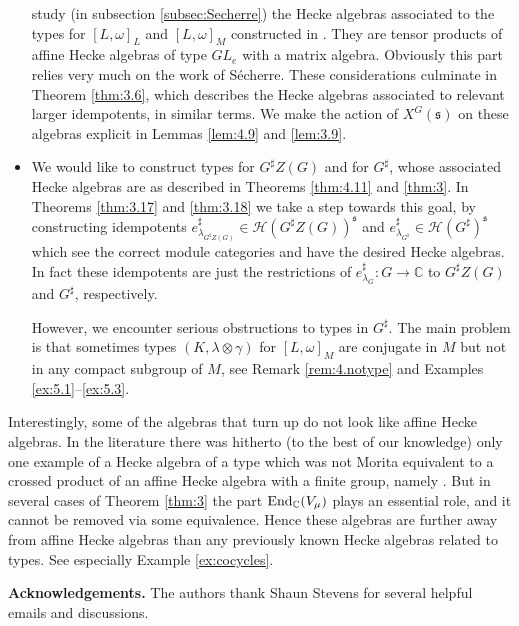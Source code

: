 \documentclass[11pt]{amsart}
\theoremstyle{definition}
\begin{document}
\begin{itemize}
study (in subsection \ref{subsec:Secherre}) the Hecke algebras associated to the types 
for $[L,\omega]_L$ and $[L,\omega]_M$ constructed in \cite{Sec3}. They are tensor products
of affine Hecke algebras of type $GL_e$ with a matrix algebra. Obviously this part relies 
very much on the work of S\'echerre. These considerations culminate in Theorem \ref{thm:3.6},
which describes the Hecke algebras associated to relevant larger idempotents, in similar 
terms. We make the action of $X^G ({{\mathfrak s}})$ on these algebras explicit in Lemmas \ref{lem:4.9} 
and \ref{lem:3.9}.
\item We would like to construct types for $G^\sharp Z(G)$ and for $G^\sharp$, whose
associated Hecke algebras are as described in Theorems \ref{thm:4.11} and \ref{thm:3}.
In Theorems \ref{thm:3.17} and \ref{thm:3.18} we take a step towards this goal, by 
constructing idempotents $e^\sharp_{\lambda_{G^\sharp Z(G)}} \in {{\mathcal H}} (G^\sharp Z(G))^{{\mathfrak s}}$ 
and $e^\sharp_{\lambda_{G^\sharp}} \in {{\mathcal H}} (G^\sharp)^{{\mathfrak s}}$ which see the correct module 
categories and have the desired Hecke algebras. In fact these idempotents are just the
restrictions of $e^\sharp_{\lambda_G} : G \to {\mathbb C}$ to $G^\sharp Z(G)$ and $G^\sharp$, 
respectively. 

However, we encounter serious obstructions to types in $G^\sharp$. The main problem
is that sometimes types $(K,\lambda \otimes \gamma)$ for $[L,\omega]_M$ are conjugate 
in $M$ but not in any compact subgroup of $M$, see Remark \ref{rem:4.notype} and
Examples \ref{ex:5.1}--\ref{ex:5.3}.
\end{itemize}

Interestingly, some of the algebras that turn up
do not look like affine Hecke algebras. In the literature there was hitherto (to the
best of our knowledge) only one example of a Hecke algebra of a type 
which was not Morita equivalent to a crossed product of an affine Hecke algebra
with a finite group, namely \cite[\S 11.8]{GoRo2}.
But in several cases of Theorem \ref{thm:3} the part ${{\rm End}}_{\mathbb C} (V_\mu)$ plays an
essential role, and it cannot be removed via some equivalence. Hence these algebras 
are further away from affine Hecke algebras than any previously known Hecke algebras 
related to types. See especially Example \ref{ex:cocycles}. 

\vspace{3mm}
\textbf{Acknowledgements.} The authors thank Shaun Stevens for several helpful emails 
and discussions.
\end{document}
